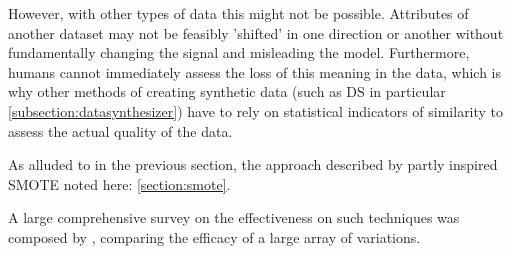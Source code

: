 \pagebreak

However, with other types of data this might not be possible. Attributes of another dataset may not be feasibly 'shifted' in one direction or another without fundamentally changing the signal and misleading the model. Furthermore, humans cannot immediately assess the loss of this meaning in the data, which is why other methods of creating synthetic data (such as \ac{DS} in particular \ref{subsection:datasynthesizer}) have to rely on statistical indicators of similarity to assess the actual quality of the data.

As alluded to in the previous section, the approach described by \cite{image_augmentation} partly inspired \ac{SMOTE} noted here: \ref{section:smote}.

A large comprehensive survey on the effectiveness on such techniques was composed by \cite{shorten2019survey}, comparing the efficacy of a large array of variations.

